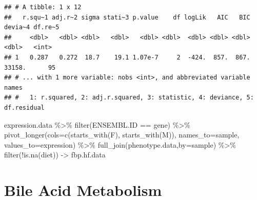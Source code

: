\documentclass[
]{article}
\newenvironment{Shaded}{\begin{snugshade}}{\end{snugshade}}
\newcommand{\AttributeTok}[1]{\textcolor[rgb]{0.77,0.63,0.00}{#1}}
\newcommand{\FunctionTok}[1]{\textcolor[rgb]{0.00,0.00,0.00}{#1}}
\newcommand{\NormalTok}[1]{#1}
\newcommand{\OtherTok}[1]{\textcolor[rgb]{0.56,0.35,0.01}{#1}}
\newcommand{\SpecialCharTok}[1]{\textcolor[rgb]{0.00,0.00,0.00}{#1}}
\newcommand{\StringTok}[1]{\textcolor[rgb]{0.31,0.60,0.02}{#1}}
\begin{document}
\begin{verbatim}
## # A tibble: 1 x 12
##   r.squ~1 adj.r~2 sigma stati~3 p.value    df logLik   AIC   BIC devia~4 df.re~5
##     <dbl>   <dbl> <dbl>   <dbl>   <dbl> <dbl>  <dbl> <dbl> <dbl>   <dbl>   <int>
## 1   0.287   0.272  18.7    19.1 1.07e-7     2  -424.  857.  867.  33158.      95
## # ... with 1 more variable: nobs <int>, and abbreviated variable names
## #   1: r.squared, 2: adj.r.squared, 3: statistic, 4: deviance, 5: df.residual
\end{verbatim}

\begin{Shaded}
\begin{Highlighting}[]
\NormalTok{expression.data }\SpecialCharTok{\%\textgreater{}\%}
  \FunctionTok{filter}\NormalTok{(ENSEMBL.ID }\SpecialCharTok{==}\NormalTok{ gene) }\SpecialCharTok{\%\textgreater{}\%}
  \FunctionTok{pivot\_longer}\NormalTok{(}\AttributeTok{cols=}\FunctionTok{c}\NormalTok{(}\FunctionTok{starts\_with}\NormalTok{(}\StringTok{\textquotesingle{}F\textquotesingle{}}\NormalTok{),}
                      \FunctionTok{starts\_with}\NormalTok{(}\StringTok{\textquotesingle{}M\textquotesingle{}}\NormalTok{)),}
               \AttributeTok{names\_to=}\StringTok{\textquotesingle{}sample\textquotesingle{}}\NormalTok{,}
               \AttributeTok{values\_to=}\StringTok{\textquotesingle{}expression\textquotesingle{}}\NormalTok{) }\SpecialCharTok{\%\textgreater{}\%}
  \FunctionTok{full\_join}\NormalTok{(phenotype.data,}\AttributeTok{by=}\StringTok{\textquotesingle{}sample\textquotesingle{}}\NormalTok{) }\SpecialCharTok{\%\textgreater{}\%}
  \FunctionTok{filter}\NormalTok{(}\SpecialCharTok{!}\FunctionTok{is.na}\NormalTok{(diet)) }\OtherTok{{-}\textgreater{}}\NormalTok{ fbp.hf.data}
\end{Highlighting}
\end{Shaded}

\hypertarget{bile-acid-metabolism}{%
\section{Bile Acid Metabolism}\label{bile-acid-metabolism}}
\end{document}
